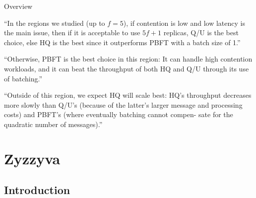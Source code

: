 \begin{frame}{Overview}

\BIL
\item “In the regions we studied (up to $f=5$), if contention is low and low
latency is the main issue, then if it is acceptable to use $5f + 1$ replicas,
Q/U is the best choice, else HQ is the best since it outperforms PBFT with a
batch size of 1.”
\item “Otherwise, PBFT is the best choice in this region: It can handle high
contention workloads, and it can beat the throughput of both HQ and Q/U
through its use of batching.”
\item “Outside of this region, we expect HQ will scale best: HQ's throughput
decreases more slowly than Q/U's (because of the latter's larger message and
processing costs) and PBFT's (where eventually batching cannot compen- sate
for the quadratic number of messages).”
\EIL

\end{frame}

\section{Zyzzyva}

\subsection{Introduction}

